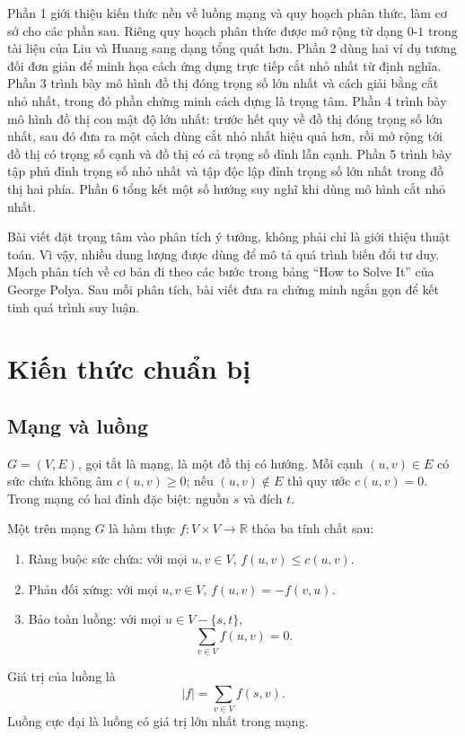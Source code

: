 \documentclass[11pt]{article}
\newcommand{\R}{\mathbb{R}}
\begin{document}
Phần 1 giới thiệu kiến thức nền về luồng mạng và quy hoạch phân thức, làm cơ
sở cho các phần sau. Riêng quy hoạch phân thức được mở rộng từ dạng \(0\)-\(1\)
trong tài liệu của Liu và Huang sang dạng tổng quát hơn. Phần 2 dùng hai ví
dụ tương đối đơn giản để minh họa cách ứng dụng trực tiếp cắt nhỏ nhất từ
định nghĩa. Phần 3 trình bày mô hình đồ thị đóng trọng số lớn nhất và cách
giải bằng cắt nhỏ nhất, trong đó phần chứng minh cách dựng là trọng tâm. Phần
4 trình bày mô hình đồ thị con mật độ lớn nhất: trước hết quy về đồ thị đóng
trọng số lớn nhất, sau đó đưa ra một cách dùng cắt nhỏ nhất hiệu quả hơn, rồi
mở rộng tới đồ thị có trọng số cạnh và đồ thị có cả trọng số đỉnh lẫn cạnh.
Phần 5 trình bày tập phủ đỉnh trọng số nhỏ nhất và tập độc lập đỉnh trọng số
lớn nhất trong đồ thị hai phía. Phần 6 tổng kết một số hướng suy nghĩ khi dùng
mô hình cắt nhỏ nhất.

Bài viết đặt trọng tâm vào phân tích ý tưởng, không phải chỉ là giới thiệu
thuật toán. Vì vậy, nhiều dung lượng được dùng để mô tả quá trình biến đổi tư
duy. Mạch phân tích về cơ bản đi theo các bước trong bảng ``How to Solve It''
của George Polya. Sau mỗi phân tích, bài viết đưa ra chứng minh ngắn gọn để
kết tinh quá trình suy luận.

\section{Kiến thức chuẩn bị}

\subsection{Mạng và luồng}

 \(G=(V,E)\), gọi tắt là mạng, là một đồ thị có hướng. Mỗi
cạnh \((u,v)\in E\) có sức chứa không âm \(c(u,v)\ge 0\); nếu
\((u,v)\notin E\) thì quy ước \(c(u,v)=0\). Trong mạng có hai đỉnh đặc biệt:
nguồn \(s\) và đích \(t\).

Một  trên mạng \(G\) là hàm thực \(f:V\times V\to\R\) thỏa ba
tính chất sau:
\begin{enumerate}
  \item Ràng buộc sức chứa: với mọi \(u,v\in V\), \(f(u,v)\le c(u,v)\).
  \item Phản đối xứng: với mọi \(u,v\in V\), \(f(u,v)=-f(v,u)\).
  \item Bảo toàn luồng: với mọi \(u\in V-\{s,t\}\),
  \[
    \sum_{v\in V} f(u,v)=0.
  \]
\end{enumerate}
Giá trị của luồng là
\[
  |f|=\sum_{v\in V} f(s,v). \tag{1.1}
\]
Luồng cực đại là luồng có giá trị lớn nhất trong mạng.
\end{document}
